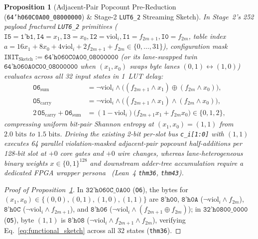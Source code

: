\documentclass[11pt,letterpaper]{article}
\theoremstyle{spectralthm}
\newtheorem{proposition}[theorem]{Proposition}
\begin{document}
\begin{proposition}[Adjacent-Pair Popcount Pre-Reduction (\texttt{64'h060C0A00\_08000000}) \& Stage-2 \texttt{LUT6\_2} Streaming Sketch]
\label{prop:lut6_functional_sketch}
In Stage~2's 252 payload fractured \mbox{\texttt{LUT6\_2}} primitives ($\texttt{I5}=\texttt{1'b1}, \texttt{I4}=x_1, \texttt{I3}=x_0, \texttt{I2}=\mathrm{viol}_i, \texttt{I1}=f_{2m+1}, \texttt{I0}=f_{2m}$, table index $a = 16x_1 + 8x_0 + 4\mathrm{viol}_i + 2f_{2m+1} + f_{2m} \in \{0,\ldots,31\}$), configuration mask $\texttt{INIT}_{\mathrm{Sketch}} := \texttt{64'h060C0A00\_08000000}$ (or its lane-swapped twin $\texttt{64'h060A0C00\_08000000}$ when $(x_1,x_0)$ swaps byte lanes $(0,1) \leftrightarrow (1,0)$) evaluates across all 32 input states in 1~LUT delay:
\begin{equation}
\label{eq:functional_sketch}
\begin{aligned}
\texttt{O6}_{\mathrm{sum}} &= \neg\mathrm{viol}_i \wedge \bigl((f_{2m+1} \wedge x_1) \oplus (f_{2m} \wedge x_0)\bigr),\\
\texttt{O5}_{\mathrm{carry}} &= \neg\mathrm{viol}_i \wedge \bigl((f_{2m+1} \wedge x_1) \wedge (f_{2m} \wedge x_0)\bigr),\\
2\,\texttt{O5}_{\mathrm{carry}} + \texttt{O6}_{\mathrm{sum}} &= (1 - \mathrm{viol}_i)\bigl(f_{2m+1}x_1 + f_{2m}x_0\bigr) \in \{0, 1, 2\},
\end{aligned}
\end{equation}
compressing uniform bit-pair Shannon entropy at $(x_1,x_0)=(1,1)$ from $2.0\text{~bits}$ to $1.5\text{~bits}$. Driving the existing 2-bit per-slot bus \texttt{c\_i[1:0]} with $(1,1)$ executes 64 parallel violation-masked adjacent-pair popcount half-additions per 128-bit slot at $+0$ core gates and $+0$ wire changes, whereas lane-heterogeneous binary weights $x \in \{0,1\}^{128}$ and downstream adder-tree accumulation require a dedicated FPGA wrapper persona~\cite{koch2021fabulous} (Lean~4 \texttt{thm36}, \texttt{thm43}).
\end{proposition}
\begin{proof}[Proof of Proposition~\ref{prop:lut6_functional_sketch}]
In $\texttt{32'h060C\_0A00}$ (\texttt{O6}), the bytes for $(x_1,x_0) \in \{(0,0),(0,1),(1,0),(1,1)\}$ are $\texttt{8'h00}$, $\texttt{8'h0A}$ ($\neg\mathrm{viol}_i \wedge f_{2m}$), $\texttt{8'h0C}$ ($\neg\mathrm{viol}_i \wedge f_{2m+1}$), and $\texttt{8'h06}$ ($\neg\mathrm{viol}_i \wedge (f_{2m+1}\oplus f_{2m})$); in $\texttt{32'h0800\_0000}$ (\texttt{O5}), byte $(1,1)$ is $\texttt{8'h08}$ ($\neg\mathrm{viol}_i \wedge f_{2m+1} \wedge f_{2m}$), verifying Eq.~\eqref{eq:functional_sketch} across all 32 states (\texttt{thm36}).
\end{proof}
\end{document}
